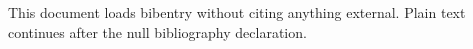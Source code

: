 \documentclass{article}
\begin{document}
This document loads bibentry without citing anything external.
\nobibliography*
Plain text continues after the null bibliography declaration.
\end{document}

